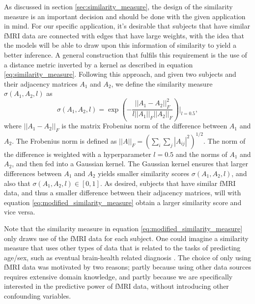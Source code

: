 As discussed in section \ref{sec:similarity_measure}, the design of the similarity measure is an important decision and should be done with the given application in mind. For our specific application, it's desirable that subjects that have similar fMRI data are connected with edges that have large weights, with the idea that the models will be able to draw upon this information of similarity to yield a better inference. A general construction that fulfils this requirement is the use of a distance metric inverted by a kernel as described in equation \eqref{eq:similarity_measure}. Following this approach, and given two subjects and their adjacency matrices $A_1$ and $A_2$, we define the similarity measure $\sigma\left(A_1, A_2, l\right)$ as
\begin{equation}
    \sigma\left(A_1, A_2, l\right) = \exp{\left(- \frac{||A_1 - A_2||_F^2}{l||A_1||_F ||A_2||_F} \right)}\biggr\rvert_{l=0.5},
    \label{eq:modified_similarity_measure}
\end{equation}
where $||A_1 - A_2 ||_F$ is the matrix Frobenius norm of the difference between $A_1$ and $A_2$. The Frobenius norm is defined as $||A||_F = \left( \sum_i \sum_j |A_{ij}|^2 \right)^{1/2}$. The norm of the difference is weighted with a hyperparameter $l=0.5$ and the norms of $A_1$ and $A_2$, and then fed into a Gaussian kernel. The Gaussian kernel ensures that larger differences between $A_1$ and $A_2$ yields smaller similarity scores $\sigma\left(A_1, A_2, l\right)$, and also that  $\sigma\left(A_1, A_2, l\right) \in \left[0, 1\right]$. As desired, subjects that have similar fMRI data, and thus a smaller difference between their adjacency matrices, will with equation \eqref{eq:modified_similarity_measure} obtain a larger similarity score and vice versa. 

Note that the similarity measure in equation \eqref{eq:modified_similarity_measure} only draws use of the fMRI data for each subject. One could imagine a similarity measure that uses other types of data that is related to the tasks of predicting age/sex, such as eventual brain-health related diagnosis \cite{stankeviciute}. The choice of only using fMRI data was motivated by two reasons; partly because using other data sources requires extensive domain knowledge, and partly because we are specifically interested in the predictive power of fMRI data, without introducing other confounding variables.

